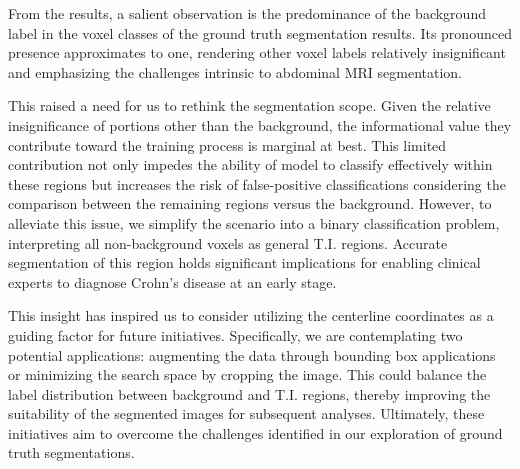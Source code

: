 From the results, a salient observation is the predominance of the background label in the voxel classes of the ground truth segmentation results. Its pronounced presence approximates to one, rendering other voxel labels relatively insignificant and emphasizing the challenges intrinsic to abdominal MRI segmentation.

This raised a need for us to rethink the segmentation scope. Given the relative insignificance of portions other than the background, the informational value they contribute toward the training process is marginal at best. This limited contribution not only impedes the ability of model to classify effectively within these regions but increases the risk of false-positive classifications considering the comparison between the remaining regions versus the background. However, to alleviate this issue, we simplify the scenario into a binary classification problem, interpreting all non-background voxels as general T.I. regions. Accurate segmentation of this region holds significant implications for enabling clinical experts to diagnose Crohn's disease at an early stage.

This insight has inspired us to consider utilizing the centerline coordinates as a guiding factor for future initiatives. Specifically, we are contemplating two potential applications: augmenting the data through bounding box applications or minimizing the search space by cropping the image. This could balance the label distribution between background and T.I. regions, thereby improving the suitability of the segmented images for subsequent analyses. Ultimately, these initiatives aim to overcome the challenges identified in our exploration of ground truth segmentations.


